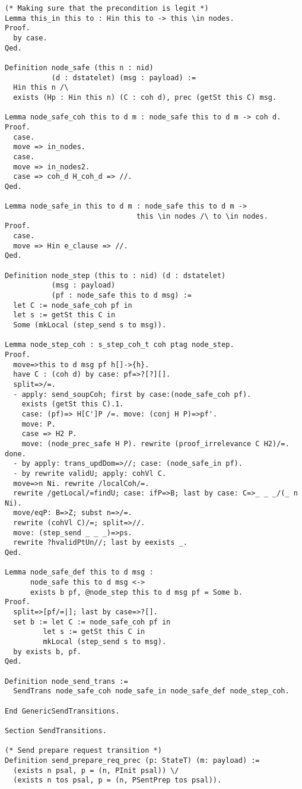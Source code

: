 \begin{landscape}
\begin{multicols*}{2}
\begin{lstlisting}[style=SourceCodeListing]
(* Making sure that the precondition is legit *)
Lemma this_in this to : Hin this to -> this \in nodes.
Proof.
  by case.
Qed.

Definition node_safe (this n : nid)
           (d : dstatelet) (msg : payload) :=
  Hin this n /\
  exists (Hp : Hin this n) (C : coh d), prec (getSt this C) msg.

Lemma node_safe_coh this to d m : node_safe this to d m -> coh d.
Proof.
  case.
  move => in_nodes.
  case.
  move => in_nodes2.
  case => coh_d H_coh_d => //.
Qed.

Lemma node_safe_in this to d m : node_safe this to d m ->
                               this \in nodes /\ to \in nodes.
Proof.
  case.
  move => Hin e_clause => //.
Qed.

Definition node_step (this to : nid) (d : dstatelet)
           (msg : payload)
           (pf : node_safe this to d msg) :=
  let C := node_safe_coh pf in
  let s := getSt this C in
  Some (mkLocal (step_send s to msg)).

Lemma node_step_coh : s_step_coh_t coh ptag node_step.
Proof.
  move=>this to d msg pf h[]->{h}.
  have C : (coh d) by case: pf=>?[?][].
  split=>/=.
  - apply: send_soupCoh; first by case:(node_safe_coh pf).
    exists (getSt this C).1.
    case: (pf)=> H[C']P /=. move: (conj H P)=>pf'.
    move: P.
    case => H2 P.
    move: (node_prec_safe H P). rewrite (proof_irrelevance C H2)/=. done.
  - by apply: trans_updDom=>//; case: (node_safe_in pf).
  - by rewrite validU; apply: cohVl C.
  move=>n Ni. rewrite /localCoh/=.
  rewrite /getLocal/=findU; case: ifP=>B; last by case: C=>_ _ _/(_ n Ni).
  move/eqP: B=>Z; subst n=>/=.
  rewrite (cohVl C)/=; split=>//.
  move: (step_send _ _ _)=>ps.
  rewrite ?hvalidPtUn//; last by eexists _.
Qed.

Lemma node_safe_def this to d msg :
      node_safe this to d msg <->
      exists b pf, @node_step this to d msg pf = Some b.
Proof.
  split=>[pf/=|]; last by case=>?[].
  set b := let C := node_safe_coh pf in
         let s := getSt this C in
         mkLocal (step_send s to msg).
  by exists b, pf.
Qed.

Definition node_send_trans :=
  SendTrans node_safe_coh node_safe_in node_safe_def node_step_coh.

End GenericSendTransitions.

Section SendTransitions.

(* Send prepare request transition *)
Definition send_prepare_req_prec (p: StateT) (m: payload) :=
  (exists n psal, p = (n, PInit psal)) \/
  (exists n tos psal, p = (n, PSentPrep tos psal)).


\end{lstlisting}
\end{multicols*}
\end{landscape}
